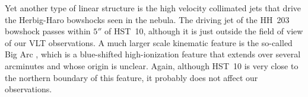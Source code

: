 \documentclass[useAMS,usenatbib]{mn2e}
\begin{document}
Yet another type of linear structure is the high velocity collimated jets 
that drive the Herbig-Haro bowshocks seen in the nebula. 
The driving jet of the HH~203 bowshock \citep{2004AJ....127.3456D} 
passes within \(5''\) of HST~10, 
although it is just outside the field of view of our VLT observations. 
A much larger scale kinematic feature is the so-called Big Arc 
\citep{2004AJ....127.3456D, 2007AJ....133..952G}, 
which is a blue-shifted high-ionization feature 
that extends over several arcminutes and whose origin is unclear. 
Again, although HST~10 is very close to the northern boundary of this feature, 
it probably does not affect our observations.





\end{document}

